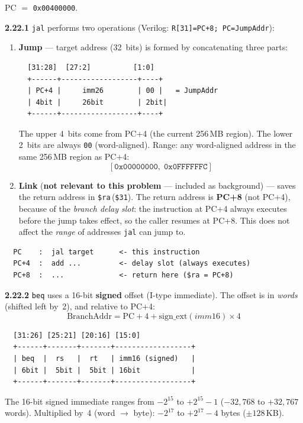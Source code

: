 PC $=$ \texttt{0x00400000}.

\noindent\textbf{2.22.1} \texttt{jal} performs two operations
(Verilog: \texttt{R[31]=PC+8; PC=JumpAddr}):

\begin{enumerate}
\item \textbf{Jump} --- target address (32~bits) is formed by
  concatenating three parts:
\begin{verbatim}
  [31:28]  [27:2]          [1:0]
  +------+------------------+----+
  | PC+4 |     imm26        | 00 |   = JumpAddr
  | 4bit |     26bit        | 2bit|
  +------+------------------+----+
\end{verbatim}
  \vspace{-6pt}
  The upper 4~bits come from PC+4 (the current 256\,MB region).
  The lower 2~bits are always \texttt{00} (word-aligned).
  Range: any word-aligned address in the same 256\,MB region as PC+4:
  \[
    [\texttt{0x00000000},\; \texttt{0x0FFFFFFC}]
  \]
\item \textbf{Link} (\textbf{not relevant to this problem} --- included
  as background) --- saves the return address in
  \texttt{\$ra}\,(\texttt{\$31}).
  The return address is \textbf{PC+8} (not PC+4), because of the
  \emph{branch delay slot}: the instruction at PC+4 always executes
  before the jump takes effect, so the caller resumes at PC+8.
  This does not affect the \emph{range} of addresses \texttt{jal}
  can jump to.
\end{enumerate}
\begin{verbatim}
  PC    :  jal target      <- this instruction
  PC+4  :  add ...         <- delay slot (always executes)
  PC+8  :  ...             <- return here ($ra = PC+8)
\end{verbatim}

\noindent\textbf{2.22.2} \texttt{beq} uses a 16-bit \textbf{signed}
offset (I-type immediate).  The offset is in \emph{words} (shifted
left by~2), and relative to PC+4:
\[
  \text{BranchAddr} = \text{PC}+4 + \text{sign\_ext}(\textit{imm16}) \times 4
\]

\begin{verbatim}
  [31:26] [25:21] [20:16] [15:0]
  +------+-------+-------+------------------+
  | beq  |  rs   |  rt   | imm16 (signed)   |
  | 6bit |  5bit |  5bit | 16bit            |
  +------+-------+-------+------------------+
\end{verbatim}
\vspace{-6pt}

The 16-bit signed immediate ranges from $-2^{15}$ to $+2^{15}-1$
($-32{,}768$ to $+32{,}767$ words).
Multiplied by~4 (word $\to$ byte):
$-2^{17}$ to $+2^{17}-4$ bytes ($\pm 128$\,KB).

